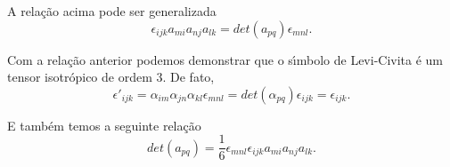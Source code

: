 A rela\c{c}\~ao acima pode ser generalizada
\[\epsilon_{ijk}a_{mi}a_{nj}a_{lk}=det(a_{pq})\epsilon_{mnl}.\]

Com a rela\c{c}\~ao anterior podemos demonstrar que  o s\'\i mbolo
de Levi-Civita \'e um tensor isotr\'opico de ordem $3$. De fato,
\[\epsilon'_{ijk}=\alpha_{im}\alpha_{jn}\alpha_{kl}\epsilon_{mnl}=det(\alpha_{pq})\epsilon_{ijk}=\epsilon_{ijk}.\]

E tamb\'em temos a seguinte rela\c{c}\~ao
\[det(a_{pq})=\frac{1}{6}\epsilon_{mnl}\epsilon_{ijk}a_{mi}a_{nj}a_{lk}.\]





